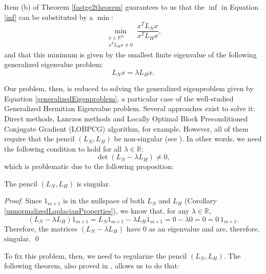 Item (b) of Theorem \vref{fastge2theorem} guarantees to us that the $\inf$ in Equation \vref{inf} can be substituted by a $\min$:
\begin{equation}\label{min}
   \min_{\substack{x \in \mathbb R^m \\ x^T L_H x \ne 0}} \frac{x^T L_N x}{x^T L_H x},
\end{equation}
and that this minimum is given by the smallest finite eigenvalue of the following generalized eigenvalue problem:
\begin{equation}\label{generalizedEigenproblem}
   L_N x = \lambda L_H x.
\end{equation}

Our problem, then, is reduced to solving the generalized eigenproblem given by Equation \vref{generalizedEigenproblem}, a particular case of the well-studied Generalized Hermitian Eigenvalue problem.
Several approaches exist to solve it: Direct methods, Lanczos methods and Locally Optimal Block Preconditioned Conjugate Gradient (LOBPCG) algorithm, for example. 
However, all of them require that the pencil $(L_N, L_H)$ be non-singular (see \cite{templates}).
In other words, we need the following condition to hold for all $\lambda \in \mathbb R$:
\begin{equation}
   \det (L_N - \lambda L_H) \ne 0,
\end{equation}
which is problematic due to the following proposition:

\begin{proposition}
   The pencil $(L_N, L_H)$ is singular.
\end{proposition}

\begin{proof}
   Since $1_{m \times 1}$ is in the nullspace of both $L_N$ and $L_H$ (Corollary \vref{unnormalizedLaplacianProperties}), we know that, for any $\lambda \in \mathbb R$,
   \begin{equation*}
      (L_N - \lambda L_H) 1_{m \times 1} = L_N 1_{m \times 1} - \lambda L_H 1_{m \times 1} = 0 - \lambda 0 = 0 = 0 \, 1_{m \times 1}.
   \end{equation*}
   Therefore, the matrices $(L_N - \lambda L_H)$ have $0$ as an eigenvalue and are, therefore, singular. \qed
\end{proof}

To fix this problem, then, we need to regularize the pencil $(L_N, L_H)$.
The following theorem, also proved in \cite{fastge2}, allows us to do that:

